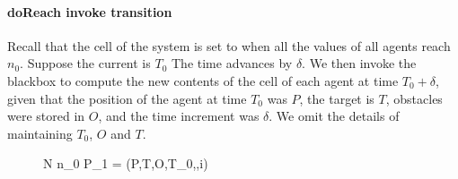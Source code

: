 \paragraph{doReach invoke transition} Recall that the  cell of the system is set to  when all the  values of all agents reach $n_0$. Suppose the current  is $T_0$ The time advances by $\delta$. We then invoke the blackbox  to compute the new contents of the  cell of each agent at time $T_0 +\delta$, given that the position of the agent at time $T_0$ was $P$, the target  is $T$, obstacles were stored in $O$, and the time increment was $\delta$. We omit the details of maintaining $T_0$, $O$ and $T$.
\begin{figure}
\label{fig:lock1}
{N  n_0  P_{1} = (P,T,O,T_0,\delta,i)}{}{}{}
\end{figure}


